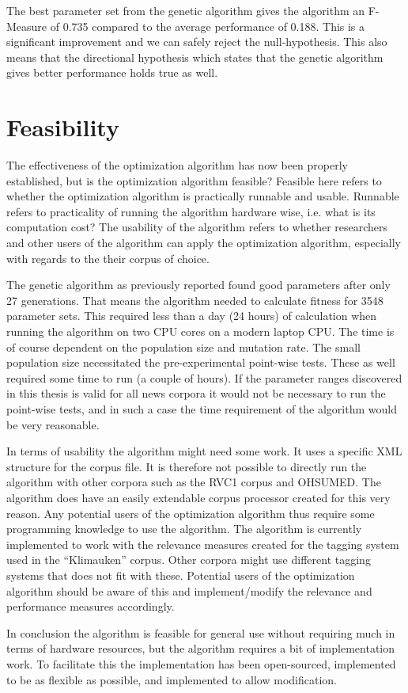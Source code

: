 The best parameter set from the genetic algorithm gives the \CTC algorithm an F-Measure of 0.735 compared to the average performance of 0.188. This is a significant improvement and we can safely reject the null-hypothesis. This also means that the directional hypothesis which states that the genetic algorithm gives better performance holds true as well.

\section{Feasibility}

The effectiveness of the optimization algorithm has now been properly established, but is the optimization algorithm feasible? Feasible here refers to whether the optimization algorithm is practically runnable and usable. Runnable refers to practicality of running the algorithm hardware wise, i.e. what is its computation cost? The usability of the algorithm refers to whether researchers and other users of the \CTC algorithm can apply the optimization algorithm, especially with regards to the their corpus of choice.

The genetic algorithm as previously reported found good parameters after only 27 generations. That means the algorithm needed to calculate fitness for 3548 parameter sets. This required less than a day (24 hours) of calculation when running the algorithm on two CPU cores on a modern laptop CPU. The time is of course dependent on the population size and mutation rate. The small population size necessitated the pre-experimental point-wise tests. These as well required some time to run (a couple of hours). If the parameter ranges discovered in this thesis is valid for all news corpora it would not be necessary to run the point-wise tests, and in such a case the time requirement of the algorithm would be very reasonable.

In terms of usability the algorithm might need some work. It uses a specific XML structure for the corpus file. It is therefore not possible to directly run the algorithm with other corpora such as the RVC1 corpus and OHSUMED. The algorithm does have an easily extendable corpus processor created for this very reason. Any potential users of the optimization algorithm thus require some programming knowledge to use the algorithm. The algorithm is currently implemented to work with the relevance measures created for the tagging system used in the ``Klimauken'' corpus. Other corpora might use different tagging systems that does not fit with these. Potential users of the optimization algorithm should be aware of this and implement/modify the relevance and performance measures accordingly.

In conclusion the algorithm is feasible for general use without requiring much in terms of hardware resources, but the algorithm requires a bit of implementation work. To facilitate this the implementation has been open-sourced, implemented to be as flexible as possible, and implemented to allow modification.
